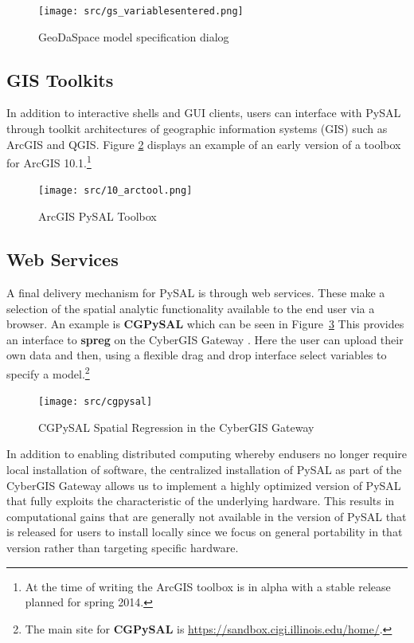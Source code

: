 \documentclass[11pt, titlepage]{amsart}
\begin{document}
\begin{figure}[ht]
\begin{center}
\texttt{[image: src/gs\_variablesentered.png]}
\end{center}
\caption{GeoDaSpace model specification dialog}
\label{f:gs}
\end{figure}   

\subsection{GIS Toolkits}

In addition to interactive shells and GUI clients, users can interface
with PySAL through toolkit architectures of geographic information
systems (GIS) such as ArcGIS and QGIS. Figure \ref{f:arcgis} displays an example of an
early version of a toolbox for ArcGIS 10.1.\footnote{At the time of
  writing the ArcGIS toolbox is in alpha with a stable release planned
  for spring 2014.}


\begin{figure}[ht]
\begin{center}
\texttt{[image: src/10\_arctool.png]}
\end{center}
\caption{ArcGIS PySAL Toolbox}
\label{f:arcgis}
\end{figure}   


\subsection{Web Services}

A final delivery mechanism for PySAL is through web services. These make
a selection of the spatial analytic functionality available to the end
user via a browser. An example is \textbf{CGPySAL} which can be seen in Figure~\ref{f:cgpysal}
This provides an interface to \textbf{spreg} on the CyberGIS Gateway \citep{Wang:2010sg}.
Here the user can upload their own data and then, using a flexible drag
and drop interface select variables to specify a model.\footnote{The
main site for \textbf{CGPySAL} is
\url{https://sandbox.cigi.illinois.edu/home/}.}

\begin{figure}[ht]
\begin{center}
\texttt{[image: src/cgpysal]}
\end{center}
\caption{CGPySAL Spatial Regression in the CyberGIS Gateway}
\label{f:cgpysal}
\end{figure}   

In addition to enabling distributed computing whereby endusers no longer
require local installation of software, the centralized installation of
PySAL as part of the CyberGIS Gateway allows us to implement a highly
optimized version of PySAL that fully exploits the characteristic of the
underlying hardware. This results in computational gains that are
generally not available in the version of PySAL that is released for
users to install locally since we focus on general portability in that
version rather than targeting specific hardware. 
\end{document}
